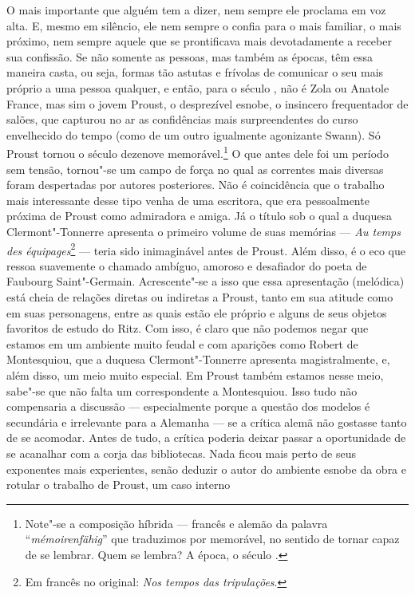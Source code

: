 O mais importante que alguém tem a dizer, nem sempre ele proclama em voz
alta. E, mesmo em silêncio, ele nem sempre o confia para o mais
familiar, o mais próximo, nem sempre aquele que se prontificava mais
devotadamente a receber sua confissão. Se não somente as pessoas, mas
também as épocas, têm essa maneira casta, ou seja, formas tão astutas e
frívolas de comunicar o seu mais próprio a uma pessoa qualquer, e então,
para o século , não é Zola ou Anatole France, mas sim o jovem Proust,
o desprezível esnobe, o insincero frequentador de salões, que capturou
no ar as confidências mais surpreendentes do curso envelhecido do tempo
(como de um outro igualmente agonizante Swann). Só Proust tornou o
século dezenove memorável.\footnote{Note"-se a composição híbrida ---
  francês e alemão da palavra ``\emph{mémoirenfähig}'' que traduzimos
  por memorável, no sentido de tornar capaz de se lembrar. Quem se
  lembra? A época, o século . \versal{[N. T.]}} O que antes dele foi um período sem
tensão, tornou"-se um campo de força no qual as correntes mais diversas
foram despertadas por autores posteriores. Não é coincidência que o
trabalho mais interessante desse tipo venha de uma escritora, que era
pessoalmente próxima de Proust como admiradora e amiga. Já o título sob
o qual a duquesa Clermont"-Tonnerre apresenta o primeiro volume de suas
memórias --- \emph{Au temps des équipages}\footnote{Em francês no original: \emph{Nos tempos das tripulações}. \versal{[N.~T.]}} --- teria sido inimaginável antes de
Proust. Além disso, é o eco que ressoa suavemente o chamado ambíguo,
amoroso e desafiador do poeta de Faubourg Saint"-Germain. Acrescente"-se a
isso que essa apresentação (melódica) está cheia de relações diretas ou
indiretas a Proust, tanto em sua atitude como em suas personagens, entre
as quais estão ele próprio e alguns de seus objetos favoritos de estudo
do Ritz. Com isso, é claro que não podemos negar que estamos em um
ambiente muito feudal e com aparições como Robert de Montesquiou, que a
duquesa Clermont"-Tonnerre apresenta magistralmente, e, além disso, um
meio muito especial. Em Proust também estamos nesse meio, sabe"-se que
não falta um correspondente a Montesquiou. Isso tudo não compensaria a
discussão --- especialmente porque a questão dos modelos é secundária e
irrelevante para a Alemanha --- se a crítica alemã não gostasse tanto de
se acomodar. Antes de tudo, a crítica poderia deixar passar a
oportunidade de se acanalhar com a corja das bibliotecas. Nada ficou
mais perto de seus exponentes mais experientes, senão deduzir o autor do
ambiente esnobe da obra e rotular o trabalho de Proust, um caso interno
